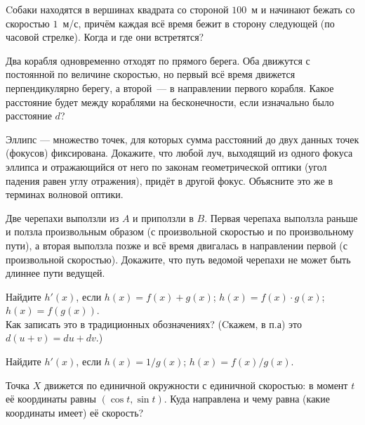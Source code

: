 \documentclass[a4paper,12pt]{article}
\begin{document}
Cобаки находятся в вершинах квадрата со стороной $100$~м и начинают бежать со скоростью $1$~м/с, причём каждая всё время бежит в сторону следующей (по часовой стрелке). Когда и где они встретятся?



Два корабля одновременно отходят по прямого берега. Оба движутся с постоянной по величине скоростью, но первый всё время движется перпендикулярно берегу, а второй~--- в направлении первого корабля. Какое расстояние будет между кораблями на бесконечности, если изначально было расстояние $d$?

Эллипс --- множество точек, для которых сумма расстояний до двух данных точек (фокусов) фиксирована. Докажите, что  любой луч, выходящий из одного фокуса эллипса и отражающийся от него по законам геометрической оптики (угол падения равен углу отражения), придёт в другой фокус. Объясните это же в терминах волновой оптики.

Две черепахи выползли из $A$ и приползли в $B$. Первая черепаха выползла раньше и ползла произвольным образом (с произвольной скоростью и по произвольному пути), а вторая выползла позже и всё время двигалась в направлении первой (с произвольной скоростью). Докажите, что путь ведомой черепахи не может быть длиннее пути ведущей.

Найдите $h'(x)$, если
 $h(x)=f(x)+g(x)$;
 $h(x)=f(x)\cdot g(x)$;
 $h(x)=f(g(x))$.
\\
Как записать это в традиционных обозначениях? (Cкажем, в п.а) это $d(u+v)=du+dv$.)

Найдите $h'(x)$, если
 $h(x)=1/g(x)$;  $h(x)=f(x)/g(x)$.

Точка $X$ движется по единичной окружности с единичной скоростью: в момент $t$ её координаты равны $(\cos t, \sin t)$.
Куда направлена и чему равна (какие координаты имеет) её скорость?



\end{document}
